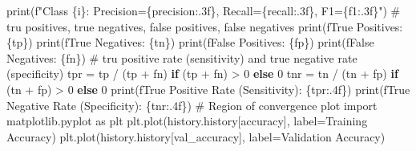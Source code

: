 \documentclass[
  letterpaper,
  DIV=11,
  numbers=noendperiod]{scrreprt}
\newenvironment{Shaded}{\begin{snugshade}}{\end{snugshade}}
\newcommand{\BuiltInTok}[1]{\textcolor[rgb]{0.00,0.23,0.31}{#1}}
\newcommand{\CommentTok}[1]{\textcolor[rgb]{0.37,0.37,0.37}{#1}}
\newcommand{\ControlFlowTok}[1]{\textcolor[rgb]{0.00,0.23,0.31}{\textbf{#1}}}
\newcommand{\DecValTok}[1]{\textcolor[rgb]{0.68,0.00,0.00}{#1}}
\newcommand{\ImportTok}[1]{\textcolor[rgb]{0.00,0.46,0.62}{#1}}
\newcommand{\NormalTok}[1]{\textcolor[rgb]{0.00,0.23,0.31}{#1}}
\newcommand{\OperatorTok}[1]{\textcolor[rgb]{0.37,0.37,0.37}{#1}}
\newcommand{\SpecialCharTok}[1]{\textcolor[rgb]{0.37,0.37,0.37}{#1}}
\newcommand{\SpecialStringTok}[1]{\textcolor[rgb]{0.13,0.47,0.30}{#1}}
\newcommand{\StringTok}[1]{\textcolor[rgb]{0.13,0.47,0.30}{#1}}
\begin{document}
\begin{Shaded}
\begin{Highlighting}[]
    \BuiltInTok{print}\NormalTok{(}\SpecialStringTok{f"Class }\SpecialCharTok{\{}\NormalTok{i}\SpecialCharTok{\}}\SpecialStringTok{: Precision=}\SpecialCharTok{\{}\NormalTok{precision}\SpecialCharTok{:.3f\}}\SpecialStringTok{, Recall=}\SpecialCharTok{\{}\NormalTok{recall}\SpecialCharTok{:.3f\}}\SpecialStringTok{, F1=}\SpecialCharTok{\{}\NormalTok{f1}\SpecialCharTok{:.3f\}}\SpecialStringTok{"}\NormalTok{)}
\CommentTok{\# tru positives, true negatives, false positives, false negatives}
\BuiltInTok{print}\NormalTok{(}\SpecialStringTok{f\textquotesingle{}True Positives: }\SpecialCharTok{\{}\NormalTok{tp}\SpecialCharTok{\}}\SpecialStringTok{\textquotesingle{}}\NormalTok{)}
\BuiltInTok{print}\NormalTok{(}\SpecialStringTok{f\textquotesingle{}True Negatives: }\SpecialCharTok{\{}\NormalTok{tn}\SpecialCharTok{\}}\SpecialStringTok{\textquotesingle{}}\NormalTok{)}
\BuiltInTok{print}\NormalTok{(}\SpecialStringTok{f\textquotesingle{}False Positives: }\SpecialCharTok{\{}\NormalTok{fp}\SpecialCharTok{\}}\SpecialStringTok{\textquotesingle{}}\NormalTok{)}
\BuiltInTok{print}\NormalTok{(}\SpecialStringTok{f\textquotesingle{}False Negatives: }\SpecialCharTok{\{}\NormalTok{fn}\SpecialCharTok{\}}\SpecialStringTok{\textquotesingle{}}\NormalTok{)}
\CommentTok{\# tru positive rate (sensitivity) and true negative rate (specificity)}
\NormalTok{tpr }\OperatorTok{=}\NormalTok{ tp }\OperatorTok{/}\NormalTok{ (tp }\OperatorTok{+}\NormalTok{ fn) }\ControlFlowTok{if}\NormalTok{ (tp }\OperatorTok{+}\NormalTok{ fn) }\OperatorTok{\textgreater{}} \DecValTok{0} \ControlFlowTok{else} \DecValTok{0}
\NormalTok{tnr }\OperatorTok{=}\NormalTok{ tn }\OperatorTok{/}\NormalTok{ (tn }\OperatorTok{+}\NormalTok{ fp) }\ControlFlowTok{if}\NormalTok{ (tn }\OperatorTok{+}\NormalTok{ fp) }\OperatorTok{\textgreater{}} \DecValTok{0} \ControlFlowTok{else} \DecValTok{0} 
\BuiltInTok{print}\NormalTok{(}\SpecialStringTok{f\textquotesingle{}True Positive Rate (Sensitivity): }\SpecialCharTok{\{}\NormalTok{tpr}\SpecialCharTok{:.4f\}}\SpecialStringTok{\textquotesingle{}}\NormalTok{)}
\BuiltInTok{print}\NormalTok{(}\SpecialStringTok{f\textquotesingle{}True Negative Rate (Specificity): }\SpecialCharTok{\{}\NormalTok{tnr}\SpecialCharTok{:.4f\}}\SpecialStringTok{\textquotesingle{}}\NormalTok{)}
\CommentTok{\# Region of convergence plot}
\ImportTok{import}\NormalTok{ matplotlib.pyplot }\ImportTok{as}\NormalTok{ plt  }
\NormalTok{plt.plot(history.history[}\StringTok{\textquotesingle{}accuracy\textquotesingle{}}\NormalTok{], label}\OperatorTok{=}\StringTok{\textquotesingle{}Training Accuracy\textquotesingle{}}\NormalTok{)}
\NormalTok{plt.plot(history.history[}\StringTok{\textquotesingle{}val\_accuracy\textquotesingle{}}\NormalTok{], label}\OperatorTok{=}\StringTok{\textquotesingle{}Validation Accuracy\textquotesingle{}}\NormalTok{)}

\end{Highlighting}
\end{Shaded}
\end{document}
